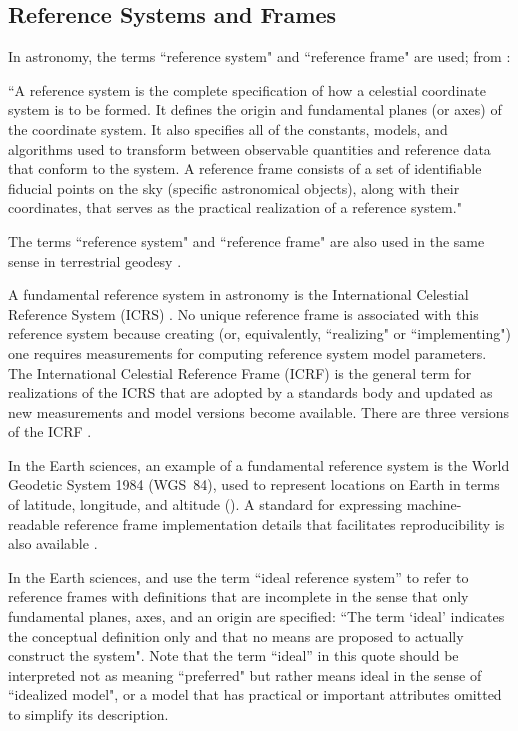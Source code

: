 \documentclass[draft]{agujournal2019}
\begin{document}
\subsection{Reference Systems and Frames}
\label{sect:refsystems}

In astronomy, the terms ``reference system" and ``reference frame" are used; from :

``A reference system is the complete specification of how a celestial coordinate system is to be formed. It defines the origin and fundamental planes (or axes) of the coordinate system. It also specifies all of the constants, models, and algorithms used to transform between observable quantities and reference data that conform to the system. A reference frame consists of a set of identifiable fiducial points on the sky (specific astronomical objects), along with their coordinates, that serves as the practical realization of a reference system."

The terms ``reference system" and ``reference frame" are also used in the same sense in terrestrial geodesy \cite{Seitz2014}.

A fundamental reference system in astronomy is the International Celestial Reference System (ICRS) \cite{Petit2010}. No unique reference frame is associated with this reference system because creating (or, equivalently, ``realizing" or ``implementing") one requires measurements for computing reference system model parameters. The International Celestial Reference Frame (ICRF) is the general term for realizations of the ICRS that are adopted by a standards body and updated as new measurements and model versions become available. There are three versions of the ICRF \cite{Charlot2020}. 

In the Earth sciences, an example of a fundamental reference system is the World Geodetic System 1984 (WGS~84), used to represent locations on Earth in terms of latitude, longitude, and altitude (). A standard for expressing machine-readable reference frame implementation details that facilitates reproducibility is also available \cite{OGC2023}.

In the Earth sciences,  and  use the term ``ideal reference system'' to refer to reference frames with definitions that are incomplete in the sense that only fundamental planes, axes, and an origin are specified: ``The term `ideal' indicates the conceptual definition only and that no means are proposed to actually construct the system". Note that the term ``ideal'' in this quote should be interpreted not as meaning ``preferred" but rather means ideal in the sense of ``idealized model", or a model that has practical or important attributes omitted to simplify its description.
\end{document}
